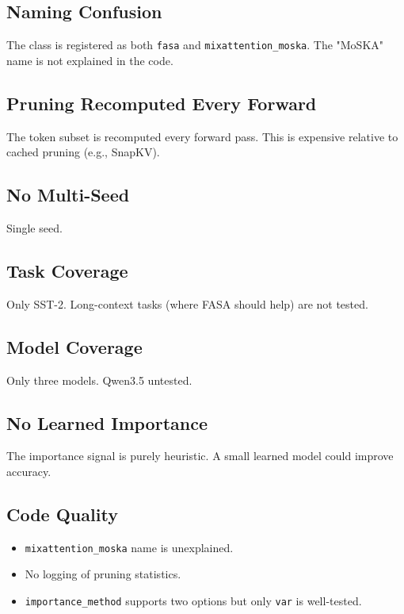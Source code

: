 \subsection{Naming Confusion}

The class is registered as both \texttt{fasa} and \texttt{mixattention\_moska}. The 
"MoSKA" name is not explained in the code.

\subsection{Pruning Recomputed Every Forward}

The token subset is recomputed every forward pass. This is expensive 
relative to cached pruning (e.g., SnapKV).

\subsection{No Multi-Seed}

Single seed.

\subsection{Task Coverage}

Only SST-2. Long-context tasks (where FASA should help) are not tested.

\subsection{Model Coverage}

Only three models. Qwen3.5 untested.

\subsection{No Learned Importance}

The importance signal is purely heuristic. A small learned model could 
improve accuracy.

\subsection{Code Quality}

\begin{itemize}
\item \texttt{mixattention\_moska} name is unexplained.
\item No logging of pruning statistics.
\item \texttt{importance\_method} supports two options but only \texttt{var} is well-tested.

\end{itemize}

